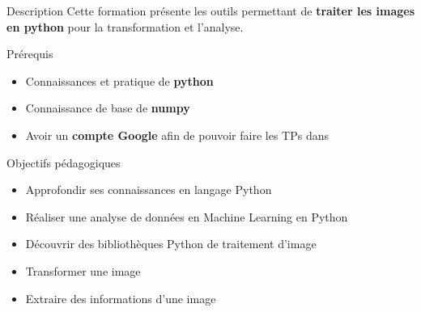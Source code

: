 \begin{frame}{Description}
  Cette formation présente les outils permettant de \alert{\textbf{traiter les images en python}} pour la transformation et l'analyse.
\end{frame}

\begin{frame}{Prérequis}
  \begin{itemize}
  \item Connaissances et pratique de \textbf{python}
  \item Connaissance de base de \textbf{numpy}
  \item Avoir un \textbf{compte Google} afin de pouvoir faire les TPs dans 
  \end{itemize}
\end{frame}

\begin{frame}{Objectifs pédagogiques}
  \begin{itemize}
  \item Approfondir ses connaissances en langage Python
  \item Réaliser une analyse de données en Machine Learning en Python
  \item Découvrir des bibliothèques Python de traitement d'image
  \item Transformer une image
  \item Extraire des informations d'une image

  \end{itemize}
\end{frame}

